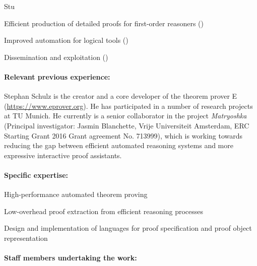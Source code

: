 \begin{sitedescription}{Stu}
\begin{compactitem}
\item Efficient production of detailed proofs for first-order
  reasoners ()
\item Improved automation for logical tools ()
\item Dissemination and exploitation ()
\end{compactitem}


\paragraph*{Relevant previous experience:}

Stephan Schulz is the creator and a core developer of the theorem
prover E (\url{https://www.eprover.org}).  He has participated in a
number of research projects at TU Munich. He currently is a senior
collaborator in the project \emph{Matryoshka} (Principal investigator:
Jasmin Blanchette, Vrije Universiteit Amsterdam, ERC Starting Grant
2016 Grant agreement No. 713999), which is working towards reducing
the gap between efficient automated reasoning systems and more
expressive interactive proof assistants.

\paragraph*{Specific expertise:}

\begin{compactitem}
\item High-performance automated theorem proving
\item Low-overhead proof extraction from efficient reasoning processes
\item Design and implementation of languages for proof specification
  and proof object representation
\end{compactitem}

\paragraph*{Staff members undertaking the work:}


\end{sitedescription}
